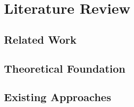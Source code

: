 \section{Literature Review}

\subsection{Related Work}

\subsection{Theoretical Foundation}

\subsection{Existing Approaches}
